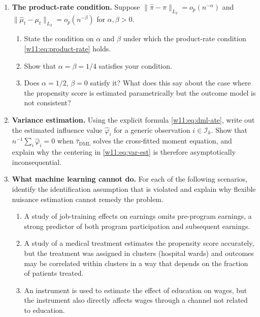 \documentclass[master.tex]{subfiles}
\begin{document}
\begin{enumerate}
\item \textbf{The product-rate condition.}
  Suppose $\|\hat\pi - \pi\|_{L_2} = o_p(n^{-\alpha})$ and
  $\|\hat\mu_t - \mu_t\|_{L_2} = o_p(n^{-\beta})$ for
  $\alpha, \beta > 0$.
  \begin{enumerate}
    \item State the condition on $\alpha$ and $\beta$ under which
      the product-rate condition \eqref{w11:eq:product-rate} holds.
    \item Show that $\alpha = \beta = 1/4$ satisfies your condition.
    \item Does $\alpha = 1/2$, $\beta = 0$ satisfy it?  What does
      this say about the case where the propensity score is
      estimated parametrically but the outcome model is not
      consistent?
  \end{enumerate}

\item \textbf{Variance estimation.}
  Using the explicit formula \eqref{w11:eq:dml-ate}, write out
  the estimated influence value $\hat\varphi_i$ for a generic
  observation $i \in \mathcal{I}_k$.  Show that
  $n^{-1}\sum_i \hat\varphi_i = 0$ when $\hat\tau_{\mathrm{DML}}$
  solves the cross-fitted moment equation, and explain why the
  centering in \eqref{w11:eq:var-est} is therefore asymptotically
  inconsequential.

\item \textbf{What machine learning cannot do.}
  For each of the following scenarios, identify the identification
  assumption that is violated and explain why flexible nuisance
  estimation cannot remedy the problem.
  \begin{enumerate}
    \item A study of job-training effects on earnings omits
      pre-program earnings, a strong predictor of both
      program participation and subsequent earnings.
    \item A study of a medical treatment estimates the propensity
      score accurately, but the treatment was assigned in clusters
      (hospital wards) and outcomes may be correlated within
      clusters in a way that depends on the fraction of patients
      treated.
    \item An instrument is used to estimate the effect of
      education on wages, but the instrument also directly
      affects wages through a channel not related to education.
  \end{enumerate}

\end{enumerate}

\ifSubfilesClassLoaded{%
  
  
}{}
\end{document}
